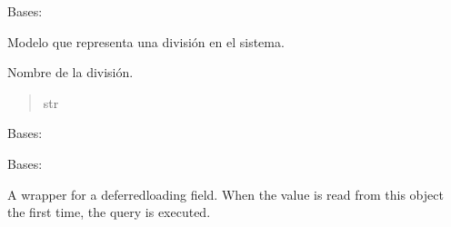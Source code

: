 \documentclass[letterpaper,10pt,spanish]{sphinxmanual}
\begin{document}
\begin{fulllineitems}

\pysigstartsignatures
{}
\pysigstopsignatures
\sphinxAtStartPar
Bases: 

\sphinxAtStartPar
Modelo que representa una división en el sistema.


\begin{fulllineitems}

\pysigstartsignatures
{}
\pysigstopsignatures
\sphinxAtStartPar
Nombre de la división.
\begin{quote}\begin{description}
\sphinxAtStartPar
str

\end{description}\end{quote}

\end{fulllineitems}



\begin{fulllineitems}

\pysigstartsignatures
{}
\pysigstopsignatures
\sphinxAtStartPar
Bases: 

\end{fulllineitems}



\begin{fulllineitems}

\pysigstartsignatures
{}
\pysigstopsignatures
\sphinxAtStartPar
Bases: 

\end{fulllineitems}



\begin{fulllineitems}

\pysigstartsignatures
{}
\pysigstopsignatures
\sphinxAtStartPar
A wrapper for a deferred\sphinxhyphen{}loading field. When the value is read from this
object the first time, the query is executed.


\end{fulllineitems}
\end{fulllineitems}
\end{document}
